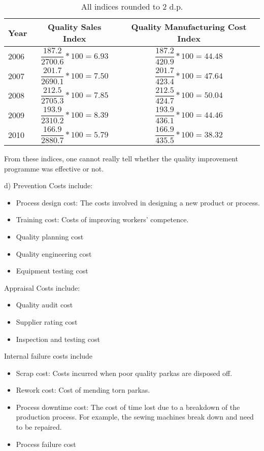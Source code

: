 \documentclass[12pt]{article}
\begin{document}
	\begin{table}[h]
	\begin{center}
	\begin{tabular}{l|c|c}
		\hline
		Year & Quality Sales Index & Quality Manufacturing Cost Index \\ \hline
		2006 & $\dfrac{187.2}{2700.6} * 100 = 6.93$ 
		& $\dfrac{187.2}{420.9} * 100 = 44.48$ \\ \hline
		2007 & $\dfrac{201.7}{2690.1} * 100 = 7.50$ 
		& $\dfrac{201.7}{423.4} * 100 = 47.64$ \\ \hline
		2008 & $\dfrac{212.5}{2705.3} * 100 = 7.85$ 
		& $\dfrac{212.5}{424.7} * 100 = 50.04$ \\ \hline
		2009 & $\dfrac{193.9}{2310.2} * 100 = 8.39$ 
		& $\dfrac{193.9}{436.1} * 100 = 44.46$ \\ \hline
		2010 & $\dfrac{166.9}{2880.7} * 100 = 5.79$ 
		& $\dfrac{166.9}{435.5} * 100 = 38.32$ \\ \hline
	\end{tabular}
	\caption{All indices rounded to 2 d.p.}
	\label{}
	\end{center}
	\end{table}

From these indices, one cannot really tell whether the quality improvement programme was effective or not.

d) Prevention Costs include:
\begin{itemize}
	\item Process design cost: The costs involved in designing a new product or process.
	\item Training cost: Costs of improving workers' competence.
	\item Quality planning cost
	\item Quality engineering cost
	\item Equipment testing cost
\end{itemize}

Appraisal Costs include:
\begin{itemize}
	\item Quality audit cost
	\item Supplier rating cost
	\item Inspection and testing cost
\end{itemize}

Internal failure costs include
\begin{itemize}
	\item Scrap cost: Costs incurred when poor quality parkas are disposed off.
	\item Rework cost: Cost of mending torn parkas.
	\item Process downtime cost: The cost of time lost due to a breakdown of the production process. For example, the sewing machines break down and need to be repaired.
	\item Process failure cost
\end{itemize}
\end{document}
